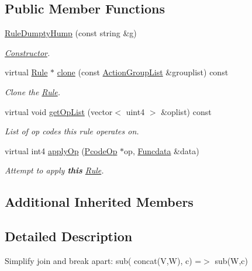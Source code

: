\subsection*{Public Member Functions}
\begin{DoxyCompactItemize}
\item 
\mbox{\hyperlink{class_rule_dumpty_hump_a1f9fd315a38117e6c3f70fdc3956f4f1}{Rule\+Dumpty\+Hump}} (const string \&g)
\begin{DoxyCompactList}\small\item\em \mbox{\hyperlink{class_constructor}{Constructor}}. \end{DoxyCompactList}\item 
virtual \mbox{\hyperlink{class_rule}{Rule}} $\ast$ \mbox{\hyperlink{class_rule_dumpty_hump_af67f659ce222cccd5531261445c70db7}{clone}} (const \mbox{\hyperlink{class_action_group_list}{Action\+Group\+List}} \&grouplist) const
\begin{DoxyCompactList}\small\item\em Clone the \mbox{\hyperlink{class_rule}{Rule}}. \end{DoxyCompactList}\item 
virtual void \mbox{\hyperlink{class_rule_dumpty_hump_a4fb2a3c24f0277c40461a7acc76b7e9c}{get\+Op\+List}} (vector$<$ uint4 $>$ \&oplist) const
\begin{DoxyCompactList}\small\item\em List of op codes this rule operates on. \end{DoxyCompactList}\item 
virtual int4 \mbox{\hyperlink{class_rule_dumpty_hump_a700703eddec46851943420aa51eefcb5}{apply\+Op}} (\mbox{\hyperlink{class_pcode_op}{Pcode\+Op}} $\ast$op, \mbox{\hyperlink{class_funcdata}{Funcdata}} \&data)
\begin{DoxyCompactList}\small\item\em Attempt to apply {\bfseries{this}} \mbox{\hyperlink{class_rule}{Rule}}. \end{DoxyCompactList}\end{DoxyCompactItemize}
\subsection*{Additional Inherited Members}


\subsection{Detailed Description}
Simplify join and break apart\+: {\ttfamily sub( concat(\+V,\+W), c) =$>$ sub(\+W,c)} 

